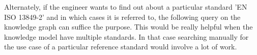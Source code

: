 \bigskip {}

\bigskip Alternately, if the engineer wants to find out about a particular standard 'EN ISO 13849-2' and in which cases it is referred to, the following query on the knowledge graph can suffice the purpose. This would be really helpful when the knowledge model have multiple standards. In that case searching manually for the use case of a particular reference standard would involve a lot of work.  


\bigskip {}

